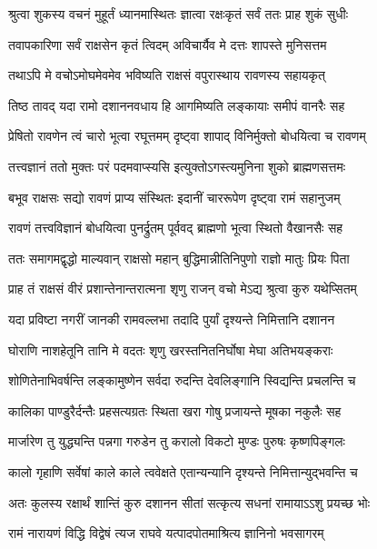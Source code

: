 \twolineshloka
{श्रुत्वा शुकस्य वचनं मुहूर्तं ध्यानमास्थितः}
{ज्ञात्वा रक्षःकृतं सर्वं ततः प्राह शुकं सुधीः} %

\twolineshloka
{तवापकारिणा सर्वं राक्षसेन कृतं त्विदम्}
{अविचार्यैव मे दत्तः शापस्ते मुनिसत्तम} %

\twolineshloka
{तथाऽपि मे वचोऽमोघमेवमेव भविष्यति}
{राक्षसं वपुरास्थाय रावणस्य सहायकृत्} %

\twolineshloka
{तिष्ठ तावद् यदा रामो दशाननवधाय हि}
{आगमिष्यति लङ्कायाः समीपं वानरैः सह} %

\twolineshloka
{प्रेषितो रावणेन त्वं चारो भूत्वा रघूत्तमम्}
{दृष्ट्वा शापाद् विनिर्मुक्तो बोधयित्वा च रावणम्} %

\twolineshloka
{तत्त्वज्ञानं ततो मुक्तः परं पदमवाप्स्यसि}
{इत्युक्तोऽगस्त्यमुनिना शुको ब्राह्मणसत्तमः} %

\twolineshloka
{बभूव राक्षसः सद्यो रावणं प्राप्य संस्थितः}
{इदानीं चाररूपेण दृष्ट्वा रामं सहानुजम्} %

\twolineshloka
{रावणं तत्त्वविज्ञानं बोधयित्वा पुनर्द्रुतम्}
{पूर्ववद् ब्राह्मणो भूत्वा स्थितो वैखानसैः सह} %

\twolineshloka
{ततः समागमद्वृद्धो माल्यवान् राक्षसो महान्}
{बुद्धिमान्नीतिनिपुणो राज्ञो मातुः प्रियः पिता} %

\twolineshloka
{प्राह तं राक्षसं वीरं प्रशान्तेनान्तरात्मना}
{शृणु राजन् वचो मेऽद्य श्रुत्वा कुरु यथेप्सितम्} %

\twolineshloka
{यदा प्रविष्टा नगरीं जानकी रामवल्लभा}
{तदादि पुर्यां दृश्यन्ते निमित्तानि दशानन} %

\twolineshloka
{घोराणि नाशहेतूनि तानि मे वदतः शृणु}
{खरस्तनितनिर्घोषा मेघा अतिभयङ्कराः} %

\twolineshloka
{शोणितेनाभिवर्षन्ति लङ्कामुष्णेन सर्वदा}
{रुदन्ति देवलिङ्गानि स्विद्यन्ति प्रचलन्ति च} %

\twolineshloka
{कालिका पाण्डुरैर्दन्तैः प्रहसत्यग्रतः स्थिता}
{खरा गोषु प्रजायन्ते मूषका नकुलैः सह} %

\twolineshloka
{मार्जारेण तु युद्ध्यन्ति पन्नगा गरुडेन तु}
{करालो विकटो मुण्डः पुरुषः कृष्णपिङ्गलः} %

\twolineshloka
{कालो गृहाणि सर्वेषां काले काले त्ववेक्षते}
{एतान्यन्यानि दृश्यन्ते निमित्तान्युद्भवन्ति च} %

\twolineshloka
{अतः कुलस्य रक्षार्थं शान्तिं कुरु दशानन}
{सीतां सत्कृत्य सधनां रामायाऽऽशु प्रयच्छ भोः} %

\twolineshloka
{रामं नारायणं विद्धि विद्वेषं त्यज राघवे}
{यत्पादपोतमाश्रित्य ज्ञानिनो भवसागरम्} %

